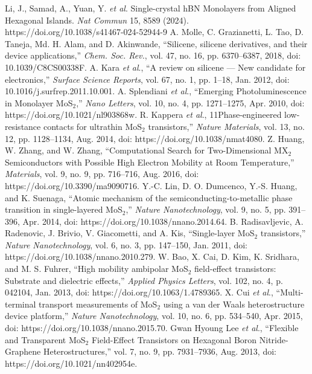 \documentclass[conference]{IEEEtran}
\begin{document}
\begin{thebibliography}{00}
   Li, J., Samad, A., Yuan, Y. \textit{et al}. Single-crystal hBN Monolayers from Aligned Hexagonal Islands. \textit{Nat Commun} 15, 8589 (2024). https://doi.org/10.1038/s41467-024-52944-9
   A. Molle, C. Grazianetti, L. Tao, D. Taneja, Md. H. Alam, and D. Akinwande, ``Silicene, silicene derivatives, and their device applications,'' \textit{Chem. Soc. Rev.}, vol. 47, no. 16, pp. 6370–6387, 2018, doi: 10.1039/C8CS00338F.
   A. Kara \textit{et al}., ``A review on silicene — New candidate for electronics,'' \textit{Surface Science Reports}, vol. 67, no. 1, pp. 1–18, Jan. 2012, doi: 10.1016/j.surfrep.2011.10.001.
 A. Splendiani \textit{et al}., ``Emerging Photoluminescence in Monolayer MoS$_2$,'' \textit{Nano Letters}, vol. 10, no. 4, pp. 1271–1275, Apr. 2010, doi: https://doi.org/10.1021/nl903868w.
 R. Kappera \textit{et al}., 11Phase-engineered low-resistance contacts for ultrathin MoS$_2$ transistors,'' \textit{Nature Materials}, vol. 13, no. 12, pp. 1128–1134, Aug. 2014, doi: https://doi.org/10.1038/nmat4080.
 Z. Huang, W. Zhang, and W. Zhang, ``Computational Search for Two-Dimensional MX$_2$ Semiconductors with Possible High Electron Mobility at Room Temperature,'' \textit{Materials}, vol. 9, no. 9, pp. 716–716, Aug. 2016, doi: https://doi.org/10.3390/ma9090716.
 Y.-C. Lin, D. O. Dumcenco, Y.-S. Huang, and K. Suenaga, ``Atomic mechanism of the semiconducting-to-metallic phase transition in single-layered MoS$_2$,'' \textit{Nature Nanotechnology}, vol. 9, no. 5, pp. 391–396, Apr. 2014, doi: https://doi.org/10.1038/nnano.2014.64.
 B. Radisavljevic, A. Radenovic, J. Brivio, V. Giacometti, and A. Kis, ``Single-layer MoS$_2$ transistors,'' \textit{Nature Nanotechnology}, vol. 6, no. 3, pp. 147–150, Jan. 2011, doi: https://doi.org/10.1038/nnano.2010.279.
 W. Bao, X. Cai, D. Kim, K. Sridhara, and M. S. Fuhrer, ``High mobility ambipolar MoS$_2$ field-effect transistors: Substrate and dielectric effects,'' \textit{Applied Physics Letters}, vol. 102, no. 4, p. 042104, Jan. 2013, doi: https://doi.org/10.1063/1.4789365.
 X. Cui \textit{et al}., ``Multi-terminal transport measurements of MoS$_2$ using a van der Waals heterostructure device platform,'' \textit{Nature Nanotechnology}, vol. 10, no. 6, pp. 534–540, Apr. 2015, doi: https://doi.org/10.1038/nnano.2015.70.
 Gwan Hyoung Lee \textit{et al}., ``Flexible and Transparent MoS$_2$ Field-Effect Transistors on Hexagonal Boron Nitride-Graphene Heterostructures,'' vol. 7, no. 9, pp. 7931–7936, Aug. 2013, doi: https://doi.org/10.1021/nn402954e.

\end{thebibliography}
\end{document}
